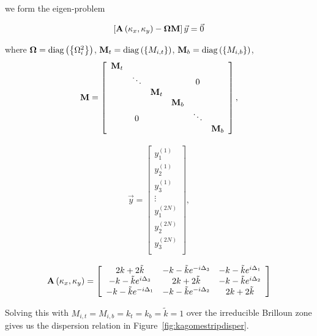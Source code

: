 we form the eigen-problem 

\begin{align}
  \left[\mathbf{A}\left(\kappa_{x},\kappa_{y}\right)-\mathbf{\Omega}\mathbf{M}\right]\vec{y}=\vec{0}
\label{eq:kagomestripeig}
\end{align}

where $\mathbf{\Omega}=\operatorname{diag}\left(\left\{\Omega_i^2\right\}\right)$,
$\mathbf{M}_{t}=\operatorname{diag}\left(\left\{M_{i,t}\right\}\right)$,
$\mathbf{M}_{b}=\operatorname{diag}\left(\left\{M_{i,b}\right\}\right)$,
\begin{align}
\mathbf{M}=\left[
\begin{array}{cccccc}
\mathbf{M}_{t}\\
 & \ddots &  &  & 0\\
 &  & \mathbf{M}_{t}\\
 &  &  & \mathbf{M}_{b}\\
 & 0 &  &  & \ddots\\
 &  &  &  &  & \mathbf{M}_{b}
\end{array}\right],
\end{align}

\begin{align}
\vec{y}=\left[
\begin{array}{c}
y_1^{(1)}\\
y_2^{(1)}\\
y_3^{(1)}\\
\vdots\\
y_1^{(2N)}\\
y_2^{(2N)}\\
y_3^{(2N)}\\
\end{array}\right],
\end{align}

\begin{align}
  \mathbf{A}\left(\kappa_{x},\kappa_{y}\right)=\left[
\begin{array}{ccc}
2k+2\tilde{k} & -k-\tilde{k}e^{-i\Delta_3} & -k-\tilde{k}e^{i\Delta_1} \\
-k-\tilde{k}e^{i\Delta_3} & 2k+2\tilde{k} & -k-\tilde{k}e^{i\Delta_2} \\
-k-\tilde{k}e^{-i\Delta_1} & -k-\tilde{k}e^{-i\Delta_2} & 2k+2\tilde{k} 
\end{array}\right]
\end{align}

Solving this with $M_{i,t}=M_{i,b}=k_t=k_b=\tilde{k}=1$ over the irreducible
Brilloun zone gives us the dispersion relation in
Figure~\ref{fig:kagomestripdisper}.


